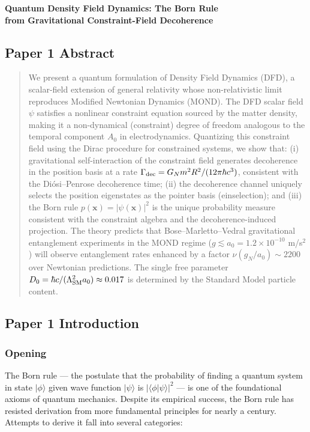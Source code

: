 \documentclass[11pt,a4paper]{article}
\begin{document}
\begin{center}
\large\textbf{Quantum Density Field Dynamics: The Born Rule\\from Gravitational Constraint-Field Decoherence}
\end{center}

\subsection{Paper 1 Abstract}

\begin{quote}
We present a quantum formulation of Density Field Dynamics (DFD), a scalar-field extension of general relativity whose non-relativistic limit reproduces Modified Newtonian Dynamics (MOND). The DFD scalar field $\psi$ satisfies a nonlinear constraint equation sourced by the matter density, making it a non-dynamical (constraint) degree of freedom analogous to the temporal component $A_0$ in electrodynamics. Quantizing this constraint field using the Dirac procedure for constrained systems, we show that: (i) gravitational self-interaction of the constraint field generates decoherence in the position basis at a rate $\Gamma_{\rm dec} = G_N m^2 R^2/(12\pi\hbar c^3)$, consistent with the Di\'{o}si--Penrose decoherence time; (ii) the decoherence channel uniquely selects the position eigenstates as the pointer basis (einselection); and (iii) the Born rule $p(\mathbf{x}) = |\psi(\mathbf{x})|^2$ is the unique probability measure consistent with the constraint algebra and the decoherence-induced projection. The theory predicts that Bose--Marletto--Vedral gravitational entanglement experiments in the MOND regime ($g \lesssim a_0 = 1.2\times10^{-10}$ m/s$^2$) will observe entanglement rates enhanced by a factor $\nu(g_N/a_0) \sim 2200$ over Newtonian predictions. The single free parameter $D_0 = \hbar c/(\Lambda_{\rm SM}^2 a_0) \approx 0.017$ is determined by the Standard Model particle content.
\end{quote}

\subsection{Paper 1 Introduction}

\subsubsection{Opening}

The Born rule --- the postulate that the probability of finding a quantum system in state $|\phi\rangle$ given wave function $|\psi\rangle$ is $|\langle\phi|\psi\rangle|^2$ --- is one of the foundational axioms of quantum mechanics. Despite its empirical success, the Born rule has resisted derivation from more fundamental principles for nearly a century. Attempts to derive it fall into several categories:
\end{document}
